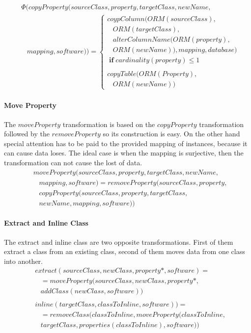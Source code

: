 \documentclass[runningheads]{comsis}
\begin{document}
\begin{align}
& \Phi(copyProperty(sourceClass, property, targetClass, newName, \nonumber \\ 
&  \; \; \; mapping, software)) = \begin{cases}
 coypColumn(ORM(sourceClass),  \\ \;\;\; ORM(targetClass),  \\ \;\;\;alterColumnName(ORM(property), \\ \;\;\; ORM(newName)), mapping, database) \\ \; \mathbf{if} \; cardinality(property) \leq 1 \\\\
 copyTable(ORM(Property), \\ \;\;\; ORM(newName))
 \end{cases}
\end{align}

\paragraph{Move Property}
The $moveProperty$ transformation is based on the $copyProperty$ transformation followed by the $removeProperty$ so its construction is easy. On the other hand special attention has to be paid to the provided mapping of instances, because it can cause data loses. The ideal case is when the mapping is surjective, then the transformation can not cause the lost of data. %
\begin{align}
& moveProperty(sourceClass, property, targetClass, newName,\nonumber  \\
& \;\;\; mapping, software) = removeProperty(sourceClass, property, \nonumber \\
& \;\;\; copyProperty(sourceClass, property, targetClass, \nonumber \\ 
& \;\;\;newName, mapping, software))
\end{align}

\paragraph{Extract and Inline Class}
The extract and inline class are two opposite transformations. First of them extract a class from an existing class, second of them moves data from one class into another.
\begin{align}
& extract(sourceClass, newClass, property*, software) = \nonumber  \\ 
& \; \; \; = moveProperty(sourceClass, newClass, property*, \nonumber \\ 
& \; \; \; addClass(newClass, software))
\\ \nonumber  \\
& inline(targetClass, classToInline, software)) =  \nonumber \\
& \; \; \; = removeClass(classToInline, moveProperty(classToInline, \nonumber \\
& \; \; \; targetClass, properties(classToInline), software))
\end{align}
\end{document}
